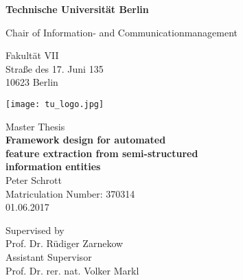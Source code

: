 \thispagestyle{empty}
\begin{center}

\vspace*{1.2cm}
{\LARGE \textbf{Technische Universität Berlin}}

\vspace{0.5cm}

{\large Chair of Information- and Communicationmanagement\\[5mm]}

Fakultät VII\\
Straße des 17. Juni 135\\
10623 Berlin\\

\vspace*{1cm}

\texttt{[image: tu\_logo.jpg]}

\vspace*{1.0cm}

{\large Master Thesis}\\

\vspace{1.0cm}
{\LARGE \textbf{Framework design for automated}}\\
\vspace*{0.25cm}
{\LARGE \textbf{feature extraction from semi-structured}}\\
\vspace*{0.35cm}
{\LARGE \textbf{ information entities}}\\
\vspace*{1.0cm}
{\LARGE Peter Schrott}
\\
\vspace*{0.5cm}
Matriculation Number: 370314\\
01.06.2017\\ %
\vspace*{1.0cm}

Supervised by\\
Prof. Dr. Rüdiger Zarnekow\\
\vspace*{0.5cm}
Assistant Supervisor\\
Prof. Dr. rer. nat. Volker Markl
\vspace{3cm}

\end{center}